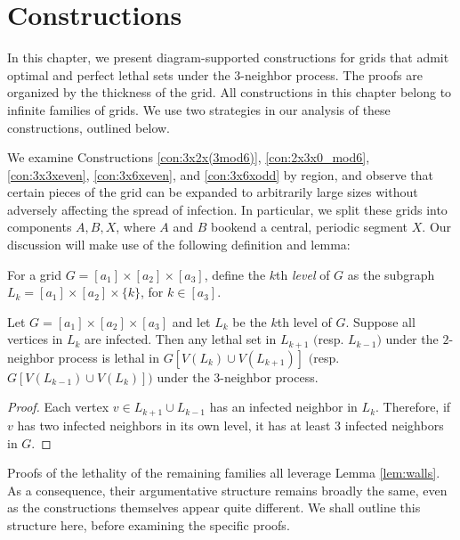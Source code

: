 \chapter{Constructions}

In this chapter, we present diagram-supported constructions for grids that admit optimal and perfect lethal sets under the 3-neighbor process. The proofs are organized by the thickness of the grid. All constructions in this chapter belong to infinite families of grids. We use two strategies in our analysis of these constructions, outlined below.

We examine Constructions \ref{con:3x2x(3mod6)}, \ref{con:2x3x0_mod6}, \ref{con:3x3xeven}, \ref{con:3x6xeven}, and \ref{con:3x6xodd} by region, and observe that certain pieces of the grid can be expanded to arbitrarily large sizes without adversely affecting the spread of infection. In particular, we split these grids into components $A,B,X$, where $A$ and $B$ bookend a central, periodic segment $X$. Our discussion will make use of the following definition and lemma:

\begin{defn}
For a grid $G=[a_1] \times [a_2] \times [a_3]$, define the $k$th \emph{level} of $G$ as the subgraph $L_k = [a_1] \times [a_2] \times \{k\}$, for $k \in [a_3]$. 
\end{defn}

\begin{lem}
\label{lem:2_neighbor_levels}
Let $G=[a_1] \times [a_2] \times [a_3]$ and let $L_k$ be the $k$th level of $G$. Suppose all vertices in $L_k$ are infected. Then any lethal set in $L_{k+1}$ $($resp. $L_{k-1}$$)$ under the $2$-neighbor process is lethal in $G[V(L_{k}) \cup V(L_{k+1})]$ $($resp. $G[V(L_{k-1}) \cup V(L_{k})]$$)$ under the 3-neighbor process. 
\end{lem}

\begin{proof}
Each vertex $v \in L_{k+1} \cup L_{k-1}$ has an infected neighbor in $L_k$. Therefore, if $v$ has two infected neighbors in its own level, it has at least 3 infected neighbors in $G$. 
\end{proof}

Proofs of the lethality of the remaining families all leverage Lemma \ref{lem:walls}. As a consequence, their argumentative structure remains broadly the same, even as the constructions themselves appear quite different. We shall outline this structure here, before examining the specific proofs. 

